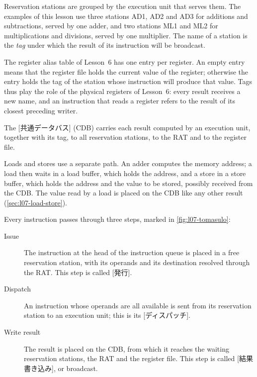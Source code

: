 \documentclass[../main.tex]{subfiles}
\begin{document}
Reservation stations are grouped by the execution unit that serves them.  The
examples of this lesson use three stations AD1, AD2 and AD3 for additions and
subtractions, served by one adder, and two stations ML1 and ML2 for
multiplications and divisions, served by one multiplier.  The name of a
station is the \emph{tag} under which the result of its instruction will be
broadcast.

The register alias table of Lesson~6 has one entry per register.  An empty
entry means that the register file holds the current value of the register;
otherwise the entry holds the tag of the station whose instruction will
produce that value.  Tags thus play the role of the physical registers of
Lesson~6: every result receives a new name, and an instruction that reads a
register refers to the result of its closest preceding writer.

\begin{definition}
  \label{def:l07-cdb}
  The [共通データバス]%
   (CDB) carries each result computed by an
  execution unit, together with its tag, to all reservation stations, to the
  RAT and to the register file.
\end{definition}

Loads and stores use a separate path.  An adder computes the memory address;
a load then waits in a load buffer, which holds the address, and a store in a
store buffer, which holds the address and the value to be stored, possibly
received from the CDB.  The value read by a load is placed on the CDB like any
other result (\cref{sec:l07-load-store}).

Every instruction passes through three steps, marked in
\cref{fig:l07-tomasulo}:
\begin{description}
  \item[Issue] The instruction at the head of the instruction queue is placed
    in a free reservation station, with its operands and its destination
    resolved through the RAT.  This step is called
    [発行].
  \item[Dispatch] An instruction whose operands are all available is sent
    from its reservation station to an execution unit; this is its
    [ディスパッチ].
  \item[Write result] The result is placed on the CDB, from which it reaches
    the waiting reservation stations, the RAT and the register file.  This
    step is called [結果書き込み], or
    broadcast.
\end{description}
\end{document}
